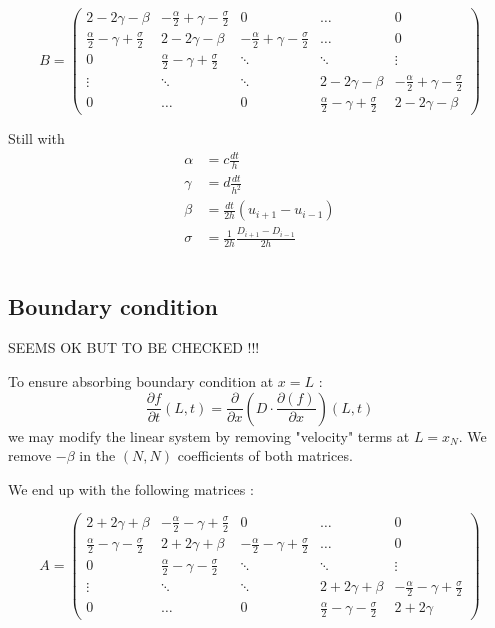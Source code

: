 \documentclass[11pt,a4paper]{article}
\begin{document}
\[
B = \begin{pmatrix}
      2-2\gamma - \beta & -\frac{\alpha}{2} + \gamma -\frac{\sigma}{2} & 0   & \dots     & 0   \\
      \frac{\alpha}{2} -  \gamma + \frac{\sigma}{2} & 2-2\gamma - \beta       & -\frac{\alpha}{2} + \gamma -\frac{\sigma}{2}  & \dots     & 0 \\
      0&         \frac{\alpha}{2} -  \gamma + \frac{\sigma}{2}& \ddots         & \ddots    & \vdots    \\
      \vdots&         \ddots&           \ddots &     2-2\gamma - \beta      & -\frac{\alpha}{2} + \gamma -\frac{\sigma}{2} \\
      0&         \dots&           0&          \frac{\alpha}{2} -  \gamma + \frac{\sigma}{2} & 2-2\gamma - \beta
  \end{pmatrix}
\]

Still with
\begin{align*}
\alpha &= c \frac{dt}{h} \\
\gamma &= d \frac{dt}{h^2}  \\
\beta  &= \frac{dt}{2h} \left( u_{i+1}-u_{i-1} \right)  \\
\sigma &= \frac{1}{2h}\frac{D_{i+1} - D_{i-1}}{2h}  \\ \\
\end{align*}




\subsection{Boundary condition}
\begin{huge}
SEEMS OK BUT TO BE CHECKED !!!
\end{huge}

To ensure absorbing boundary condition at $x=L$ : \[
\frac{\partial f}{\partial t}(L,t) = 
	\frac{\partial}{\partial x}\left(D \cdot \frac{\partial( f )}{\partial x}\right)(L,t)
\]
we may modify the linear system by removing "velocity" terms at $L = x_N$.
We remove $-\beta$ in the $(N, N)$ coefficients of both matrices.

We end up with the following matrices :  

\[
A = \begin{pmatrix}
      2+2\gamma + \beta &-\frac{\alpha}{2} - \gamma +\frac{\sigma}{2} & 0   & \dots     & 0   \\
      \frac{\alpha}{2} -  \gamma - \frac{\sigma}{2} & 2+2\gamma + \beta       & -\frac{\alpha}{2} - \gamma +\frac{\sigma}{2}  & \dots     & 0 \\
      0&         \frac{\alpha}{2} -  \gamma - \frac{\sigma}{2}& \ddots         & \ddots    & \vdots    \\
      \vdots&         \ddots&           \ddots &     2+2\gamma + \beta      & -\frac{\alpha}{2} - \gamma +\frac{\sigma}{2} \\
      0&         \dots&           0&          \frac{\alpha}{2} -  \gamma - \frac{\sigma}{2} & 2+2\gamma 
  \end{pmatrix}
\]
\end{document}
